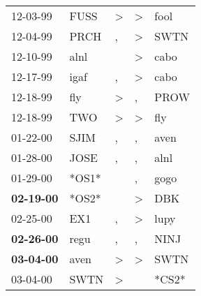 \begin{supertabular}{p{0.07\textwidth}p{0.06\textwidth}p{0.02\textwidth}p{0.02\textwidth}p{0.06\textwidth}}
          12-03-99\textsuperscript{} &           FUSS\textsuperscript{} &     \textgreater &     \textgreater &           fool\textsuperscript{} \\
          12-04-99\textsuperscript{} &           PRCH\textsuperscript{} &                , &     \textgreater &           SWTN\textsuperscript{} \\
          12-10-99\textsuperscript{} &           alnl\textsuperscript{} &                  &     \textgreater &           cabo\textsuperscript{} \\
          12-17-99\textsuperscript{} &           igaf\textsuperscript{} &                , &     \textgreater &           cabo\textsuperscript{} \\
          12-18-99\textsuperscript{} &            fly\textsuperscript{} &     \textgreater &                , &           PROW\textsuperscript{} \\
          12-18-99\textsuperscript{} &            TWO\textsuperscript{} &     \textgreater &     \textgreater &            fly\textsuperscript{} \\
          01-22-00\textsuperscript{} &           SJIM\textsuperscript{} &                , &                , &           aven\textsuperscript{} \\
          01-28-00\textsuperscript{} &           JOSE\textsuperscript{} &                , &                , &           alnl\textsuperscript{} \\
          01-29-00\textsuperscript{} &                            *OS1* &                  &                , &           gogo\textsuperscript{} \\
 \textbf{02-19-00\textsuperscript{}} &                            *OS2* &                  &     \textgreater &            DBK\textsuperscript{} \\
          02-25-00\textsuperscript{} &            EX1\textsuperscript{} &                , &     \textgreater &           lupy\textsuperscript{} \\
 \textbf{02-26-00\textsuperscript{}} &           regu\textsuperscript{} &                , &                , &           NINJ\textsuperscript{} \\
 \textbf{03-04-00\textsuperscript{}} &           aven\textsuperscript{} &     \textgreater &     \textgreater &           SWTN\textsuperscript{} \\
          03-04-00\textsuperscript{} &           SWTN\textsuperscript{} &     \textgreater &                  &                            *CS2* \\

\end{supertabular}
